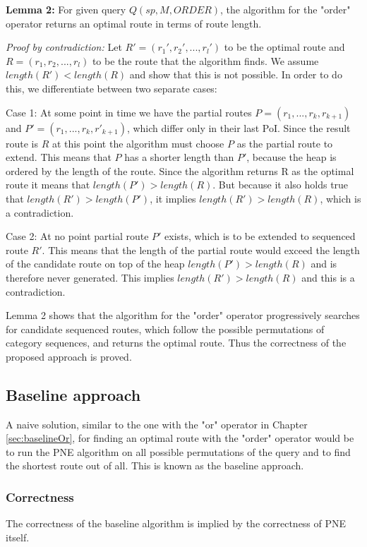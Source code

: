 \textbf{Lemma 2:} For given query $Q(sp, M, ORDER)$, the algorithm for the "order" operator returns an optimal route in terms of route length.

\textit{Proof by contradiction:} Let $R' = (r_1', r_2', ..., r_l')$ to be the optimal route and $R = (r_1, r_2, ..., r_l)$ to be the route that the algorithm finds. We assume $length(R') < length(R)$ and show that this is not possible. In order to do this, we differentiate between two separate cases: 

Case 1: At some point in time we have the partial routes $P = (r_1, ..., r_k, r_{k+1})$ and $P' = (r_1, ..., r_k, r'_{k+1})$, which differ only in their last PoI. Since the result route is $R$ at this point the algorithm must choose $P$ as the partial route to extend. This means that $P$ has a shorter length than $P'$, because the heap is ordered by the length of the route. Since the algorithm returns R as the optimal route it means that $length(P') > length(R)$. But because it also holds true that $length(R') > length(P')$, it implies $length(R') > length(R)$, which is a contradiction.

Case 2: At no point partial route $P'$ exists, which is to be extended to sequenced route $R'$. This means that the length of the partial route would exceed the length of the candidate route on top of the heap $length(P') > length(R)$ and is therefore never generated. This implies $length(R') > length(R)$ and this is a contradiction.

Lemma 2 shows that the algorithm for the "order" operator progressively searches for candidate sequenced routes, which follow the possible permutations of category sequences, and returns the optimal route. Thus the correctness of the proposed approach is proved.

\subsection{Baseline approach} 
\label{sec:baselineOrder}
A naive solution, similar to the one with the "or" operator in Chapter \ref{sec:baselineOr}, for finding an optimal route with the "order" operator would be to run the PNE algorithm on all possible permutations of the query and to find the shortest route out of all. This is known as the baseline approach.

\subsubsection{Correctness}
The correctness of the baseline algorithm is implied by the correctness of PNE itself.